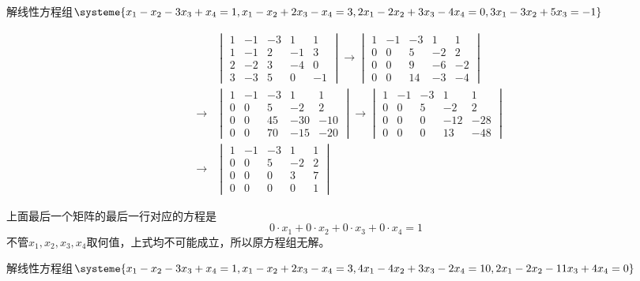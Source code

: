 \begin{eg}
解线性方程组$\systeme{x_1 - x_2 - 3x_3 + x_4 = 1 , x_1 - x_2 + 2x_3 - x_4 = 3 , 2x_1 - 2x_2 + 3x_3 - 4x_4 = 0 , 3x_1 - 3x_2 + 5x_3 = -1 }$
\end{eg}
\begin{solution}
\begin{eqnarray*}
& & \begin{vmatrix} 1 & -1 & -3 & 1 & 1 \\ 1 & -1 & 2 & -1 & 3 \\ 2 & -2 & 3 & -4 & 0 \\ 3 & -3 & 5 & 0 & -1 \end{vmatrix} \longrightarrow \begin{vmatrix} 1 & -1 & -3 & 1 & 1 \\ 0 & 0 & 5 & -2 & 2 \\ 0 & 0 & 9 & -6 & -2 \\ 0 & 0 & 14 & -3 & -4 \end{vmatrix} \\
&\longrightarrow & \begin{vmatrix} 1 & -1 & -3 & 1 & 1 \\ 0 & 0 & 5 & -2 & 2 \\ 0 & 0 & 45 & -30 & -10 \\ 0 & 0 & 70 & -15 & -20 \end{vmatrix}
\longrightarrow \begin{vmatrix} 1 & -1 & -3 & 1 & 1 \\ 0 & 0 & 5 & -2 & 2 \\ 0 & 0 & 0 & -12 & -28 \\ 0 & 0 & 0 & 13 & -48 \end{vmatrix} \\ &\longrightarrow & \begin{vmatrix} 1 & -1 & -3 & 1 & 1 \\ 0 & 0 & 5 & -2 & 2 \\ 0 & 0 & 0 & 3 & 7 \\ 0 & 0 & 0 & 0 & 1 \end{vmatrix}
\end{eqnarray*}

上面最后一个矩阵的最后一行对应的方程是
$$0\cdot x_1 + 0\cdot x_2 + 0\cdot x_3 + 0\cdot x_4 = 1$$
不管$x_1, x_2, x_3, x_4$取何值，上式均不可能成立，所以原方程组无解。
\end{solution}

\vspace{1.5em}

\begin{eg}
解线性方程组$\systeme{x_1 - x_2 - 3x_3 + x_4 = 1 , x_1 - x_2 + 2x_3 - x_4 = 3 , 4x_1 - 4x_2 + 3x_3 - 2x_4 = 10 , 2x_1 - 2x_2 - 11x_3 + 4x_4 = 0}$
\end{eg}


